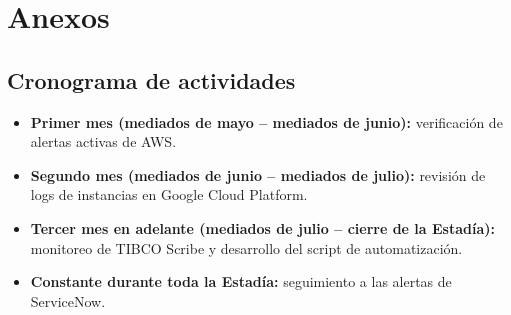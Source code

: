 \documentclass[12pt]{article}
\begin{document}
\clearpage

\thispagestyle{empty}
\ClearWallPaper
\tableofcontents


\clearpage
{}
\setcounter{page}{1}
\pagestyle{fancy}



\clearpage


\clearpage


\clearpage


\clearpage


\clearpage


\clearpage




\clearpage
{} 
\printbibliography
 
\clearpage
{}
\section*{Anexos}

\subsection*{Cronograma de actividades}

\begin{itemize}
    \item \textbf{Primer mes (mediados de mayo -- mediados de junio):} verificación de alertas activas de AWS.
    \item \textbf{Segundo mes (mediados de junio -- mediados de julio):} revisión de logs de instancias en Google Cloud Platform.
    \item \textbf{Tercer mes en adelante (mediados de julio -- cierre de la Estadía):} monitoreo de TIBCO Scribe y desarrollo del script de automatización.
    \item \textbf{Constante durante toda la Estadía:} seguimiento a las alertas de ServiceNow.
\end{itemize}
\end{document}
